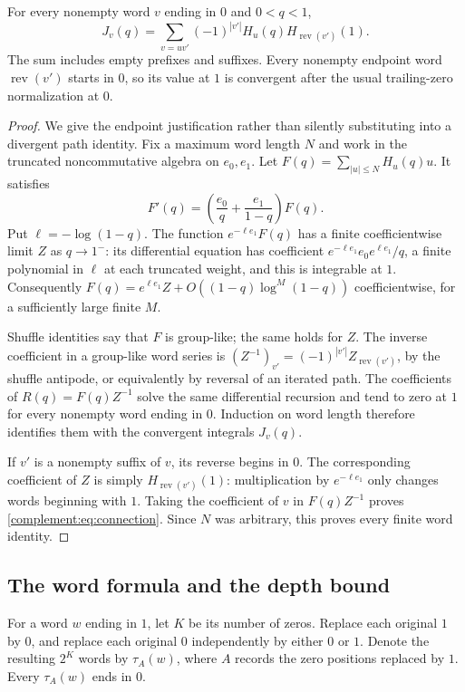 \begin{lemma}\label{complement:lem:connection}
For every nonempty word $v$ ending in $0$ and $0<q<1$,
\begin{equation}\label{complement:eq:connection}
 J_v(q)=\sum_{v=uv'}(-1)^{|v'|}H_u(q)H_{\operatorname{rev}(v')}(1).
\end{equation}
The sum includes empty prefixes and suffixes. Every nonempty endpoint
word $\operatorname{rev}(v')$ starts in $0$, so its value at $1$ is
convergent after the usual trailing-zero normalization at $0$.
\end{lemma}
\begin{proof}
We give the endpoint justification rather than silently substituting into
a divergent path identity. Fix a maximum word length $N$ and work in the
truncated noncommutative algebra on $e_0,e_1$. Let
$F(q)=\sum_{|u|\le N}H_u(q)u$. It satisfies
\[
 F'(q)=\left(\frac{e_0}{q}+\frac{e_1}{1-q}\right)F(q).
\]
Put $\ell=-\log(1-q)$. The function $e^{-\ell e_1}F(q)$ has a finite
coefficientwise limit $Z$ as $q\to1^-$: its differential equation has
coefficient $e^{-\ell e_1}e_0e^{\ell e_1}/q$, a finite polynomial in
$\ell$ at each truncated weight, and this is integrable at $1$.
Consequently
$F(q)=e^{\ell e_1}Z+O((1-q)\log^M(1-q))$
coefficientwise, for a sufficiently large finite $M$.

Shuffle identities say that $F$ is group-like; the same holds for $Z$.
The inverse coefficient in a group-like word series is
$(Z^{-1})_{v'}=(-1)^{|v'|}Z_{\operatorname{rev}(v')}$, by the shuffle
antipode, or equivalently by reversal of an iterated path.
The coefficients of $R(q)=F(q)Z^{-1}$ solve the same differential
recursion and tend to zero at $1$ for every nonempty word ending in $0$.
Induction on word length therefore identifies them with the convergent
integrals $J_v(q)$.

If $v'$ is a nonempty suffix of $v$, its reverse begins in $0$.
The corresponding coefficient of $Z$ is simply
$H_{\operatorname{rev}(v')}(1)$: multiplication by
$e^{-\ell e_1}$ only changes words beginning with $1$.
Taking the coefficient of $v$ in $F(q)Z^{-1}$ proves
\eqref{complement:eq:connection}. Since $N$ was arbitrary, this proves every finite
word identity.
\end{proof}

\subsection{The word formula and the depth bound}
For a word $w$ ending in $1$, let $K$ be its number of zeros. Replace
each original $1$ by $0$, and replace each original $0$ independently
by either $0$ or $1$. Denote the resulting $2^K$ words by $\tau_A(w)$,
where $A$ records the zero positions replaced by $1$.
Every $\tau_A(w)$ ends in $0$.

